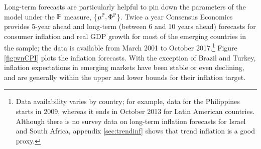 {Long-term forecasts are particularly helpful to pin down the parameters of the model under the \(\mathbb{P}\) measure, \{\(\mu^{\mathbb{P}}, \Phi^{\mathbb{P}}\)\}.
Twice a year Consensus Economics provides 5-year ahead and long-term (between 6 and 10 years ahead) forecasts for consumer inflation and real GDP growth for most of the emerging countries in the sample; the data is available from March 2001 to October 2017.\footnote{ Data availability varies by country; for example, data for the Philippines starts in 2009, whereas it ends in October 2013 for Latin American countries. Although there is no survey data on long-term inflation forecasts for Israel and South Africa, appendix \ref{sec:trendinf} shows that trend inflation is a good proxy.}
Figure \ref{fig:wnCPI} 
plots the inflation forecasts. %
With the exception of Brazil and Turkey, inflation expectations in emerging markets have been stable or even declining, and are generally within the upper and lower bounds for their inflation target.


}
